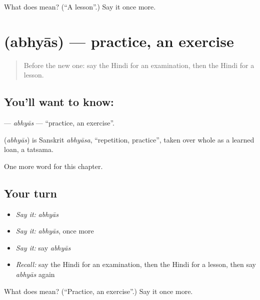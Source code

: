 \begin{tcolorbox}[breakable,colback=teal!4,colframe=teal!35!black,title={Before you move on}]
What does  mean? (\textquotedblleft{}A lesson\textquotedblright{}.) Say it once more.
\end{tcolorbox}
\section[\texorpdfstring{\hi{अभ्यास} (abhyās)}{अभ्यास (abhyās)}]{ (abhyās) — practice, an exercise}

\label{lesson:HI-C197-abhyas}



\begin{quote}
Before the new one: say the Hindi for an examination, then the Hindi for a lesson.
\end{quote}

\subsection*{You'll want to know: }
\textbf{} — \emph{abhyās} — \textquotedblleft{}practice, an exercise\textquotedblright{}.

\begin{cousinweb}
\textbf{} (\emph{abhyās}) is Sanskrit \emph{abhyāsa}, \textquotedblleft{}repetition, practice\textquotedblright{}, taken over whole as a learned loan, a tatsama.
\end{cousinweb}

\begin{grammarlens}[title={What you've built}]
One more word for this chapter.
\end{grammarlens}

\subsection*{Your turn}
\begin{itemize}
\raggedright
  \item \emph{Say it:} \emph{abhyās}
  \item \emph{Say it:} \emph{abhyās}, once more
  \item \emph{Say it:} say \emph{abhyās}
  \item \emph{Recall:} say the Hindi for an examination, then the Hindi for a lesson, then say \emph{abhyās} again
\end{itemize}

\begin{tcolorbox}[breakable,colback=teal!4,colframe=teal!35!black,title={Before you move on}]
What does  mean? (\textquotedblleft{}Practice, an exercise\textquotedblright{}.) Say it once more.
\end{tcolorbox}
